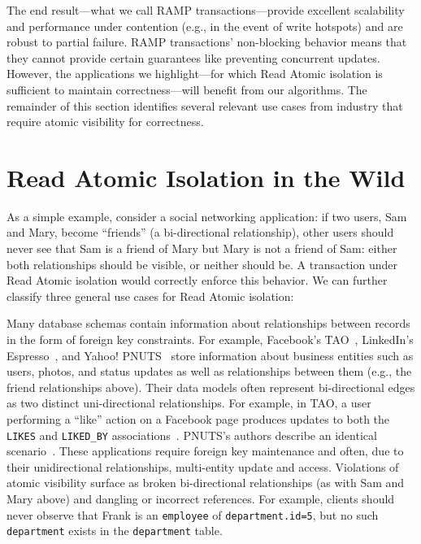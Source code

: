 The end result---what we call RAMP transactions---provide excellent
scalability and performance under contention (e.g., in the event of
write hotspots) and are robust to partial failure. RAMP transactions'
non-blocking behavior means that they cannot provide certain
guarantees like preventing concurrent updates. However, the
applications we highlight---for which Read Atomic isolation is
sufficient to maintain correctness---will benefit from our
algorithms. The remainder of this section identifies several relevant
use cases from industry that require atomic visibility for
correctness.

\section{Read Atomic Isolation in the Wild}
\label{sec:usecases}

As a simple example, consider a social networking application: if two
users, Sam and Mary, become ``friends'' (a bi-directional
relationship), other users should never see that Sam is a friend of
Mary but Mary is not a friend of Sam: either both relationships should
be visible, or neither should be. A transaction under Read Atomic
isolation would correctly enforce this behavior. We can further
classify three general use cases for Read Atomic isolation:

 Many database schemas contain
information about relationships between records in the form of foreign
key constraints. For example, Facebook's TAO~\cite{tao}, LinkedIn's
Espresso~\cite{espresso}, and Yahoo! PNUTS~\cite{pnuts} store
information about business entities such as users, photos, and status
updates as well as relationships between them (e.g., the friend
relationships above). Their data models often represent bi-directional
edges as two distinct uni-directional relationships. For example, in
TAO, a user performing a ``like'' action on a Facebook page produces
updates to both the \texttt{LIKES} and \texttt{LIKED\_BY}
associations~\cite{tao}. PNUTS's authors describe an identical
scenario~\cite{pnuts}. These applications require foreign key
maintenance and often, due to their unidirectional relationships,
multi-entity update and access. Violations of atomic visibility
surface as broken bi-directional relationships (as with Sam and Mary
above) and dangling or incorrect references. For example, clients
should never observe that Frank is an \texttt{employee} of
\texttt{department.id=5}, but no such \texttt{department} exists in
the \texttt{department} table.

